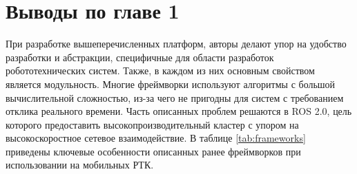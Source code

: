 \section*{Выводы по главе 1}

При разработке вышеперечисленных платформ, авторы делают упор на 
удобство разработки и абстракции, специфичные для области 
разработок робототехнических систем. Также, в каждом из них 
основным свойством является модульность. Многие фреймворки 
используют алгоритмы с большой вычислительной сложностью, из-за 
чего не пригодны для систем с требованием отклика реального 
времени. Часть описанных проблем решаются в ROS 2.0, цель 
которого предоставить высокопроизводительный кластер с упором на 
высокоскоростное сетевое взаимодействие. В таблице 
\ref{tab:frameworks} приведены ключевые особенности описанных 
ранее фреймворков при использовании на мобильных РТК.

